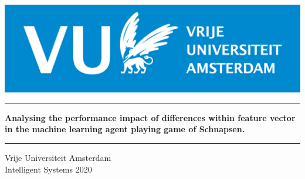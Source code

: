 \documentclass[master]{subfiles}
\begin{document}
\begin{titlepage}

\includegraphics[width=0.4\linewidth, left]{images/vulogo.png}
\centering

\vspace*{\fill}


\rule{315px}{1.5px}
{\par\nobreak\vspace{5px}}
\LARGE{\textbf{Analysing the performance impact of differences within feature vector in the machine learning agent playing game of Schnapsen.}}
\rule{315px}{1.5px}

\vspace*{\fill}

Vrije Universiteit Amsterdam\\
Intelligent Systems 2020
\end{titlepage}
\clearpage

\tableofcontents
\clearpage

\end{document}
